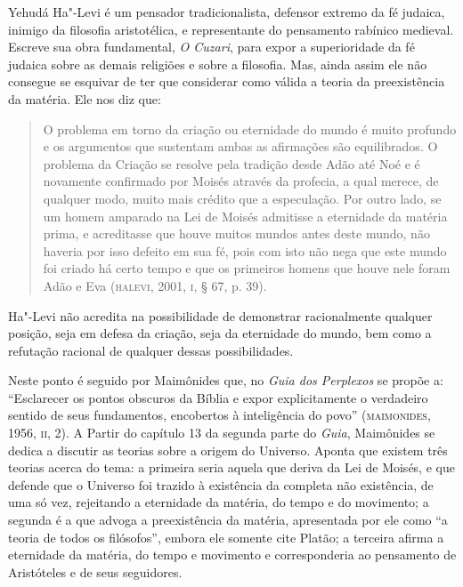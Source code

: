 Yehudá Ha"-Levi é um pensador tradicionalista, defensor extremo da fé
judaica, inimigo da filosofia aristotélica, e representante do
pensamento rabínico medieval. Escreve sua obra fundamental, \emph{O Cuzari},
para expor a superioridade da fé judaica sobre as demais religiões e
sobre a filosofia. Mas, ainda assim ele não consegue se esquivar de
ter que considerar como válida a teoria da preexistência da matéria.
Ele nos diz que:

\begin{quote}
O problema em torno da criação ou eternidade do mundo é muito profundo
e os argumentos que sustentam ambas as afirmações são equilibrados. O
problema da Criação se resolve pela tradição desde Adão até Noé e é
novamente confirmado por Moisés através da profecia, a qual merece,
de qualquer modo, muito mais crédito que a especulação. Por outro
lado, se um homem amparado na Lei de Moisés admitisse a eternidade da
matéria prima, e acreditasse que houve muitos mundos antes deste
mundo, não haveria por isso defeito em sua fé, pois com isto não nega
que este mundo foi criado há certo tempo e que os primeiros homens
que houve nele foram Adão e Eva (\textsc{halevi}, 2001, \textsc{i}, § 67, p. 39).
\end{quote}

Ha"-Levi não acredita na possibilidade de demonstrar racionalmente
qualquer posição, seja em defesa da criação, seja da eternidade do
mundo, bem como a refutação racional de qualquer dessas
possibilidades. 

Neste ponto é seguido por Maimônides que, no \emph{Guia dos
Perplexos} se propõe a: “Esclarecer os pontos obscuros da Bíblia e
expor explicitamente o verdadeiro sentido de seus fundamentos,
encobertos à inteligência do povo” (\textsc{maimonides}, 1956,
\textsc{ii}, 2). A
Partir do capítulo 13 da segunda parte do \emph{Guia}, Maimônides
se dedica a discutir as teorias sobre a origem do Universo. Aponta
que existem três teorias acerca do tema: a primeira seria aquela que
deriva da Lei de Moisés, e que defende que o Universo foi trazido à
existência da completa não existência, de uma só vez, rejeitando a
eternidade da matéria, do tempo e do movimento; a segunda é a que
advoga a preexistência da matéria, apresentada por ele como “a teoria
de todos os filósofos”, embora ele somente cite Platão; a terceira
afirma a eternidade da matéria, do tempo e movimento e corresponderia
ao pensamento de Aristóteles e de seus seguidores.

